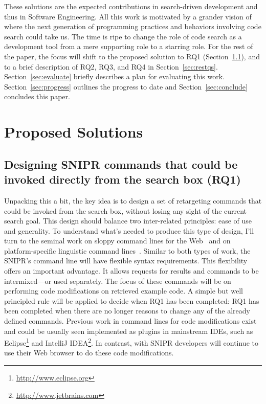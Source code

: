 \documentclass[conference]{IEEEtran}
\begin{document}
These solutions are the expected contributions in search-driven development and thus in Software Engineering. All this work is motivated by a grander vision of where the next generation of programming practices and behaviors involving code search could take us. The time is ripe to change the role of code search as a development tool from a mere supporting role to a starring role. For the rest of the paper, the focus will shift to the proposed solution to RQ1 (Section~\ref{sec:rq1}), and to a brief description of RQ2, RQ3, and RQ4 in Section~\ref{sec:restqs}. Section~\ref{sec:evaluate} briefly describes a plan for evaluating this work. Section~\ref{sec:progress} outlines the progress to date and Section~\ref{sec:conclude} concludes this paper. 

\section{Proposed Solutions}
\subsection{Designing \uppercase{SnipR} commands that could be invoked directly from the search box (RQ1)}
\label{sec:rq1}
Unpacking this a bit, the key idea is to design a set of retargeting commands that could be invoked from the search box, without losing any sight of the current search goal. This design should balance two inter-related principles: ease of use and generality. To understand what's needed to produce this type of design, I'll turn to the seminal work on sloppy command lines for the Web~\cite{Little:2007dh, Miller:2008ge} and on platform-specific linguistic command lines~\cite{Raskin:2008wb}. Similar to both types of work, the \uppercase{SnipR}'s command line will have flexible syntax requirements. This flexibility offers an important advantage. It allows requests for results and commands to be intermixed---or used separately. The focus of these commands will be on performing code modifications on retrieved example code. A simple but well principled rule will be applied to decide when RQ1 has been completed: RQ1 has been completed when there are no longer reasons to change any of the already defined commands. Previous work in command lines for code modifications exist and could be usually seen implemented as plugins in mainstream IDEs, such as Eclipse\footnote{\url{http://www.eclipse.org}} and IntelliJ IDEA\footnote{\url{http://www.jetbrains.com}}. In contrast, with \uppercase{SnipR} developers will continue to use their Web browser to do these code modifications. 
\end{document}

